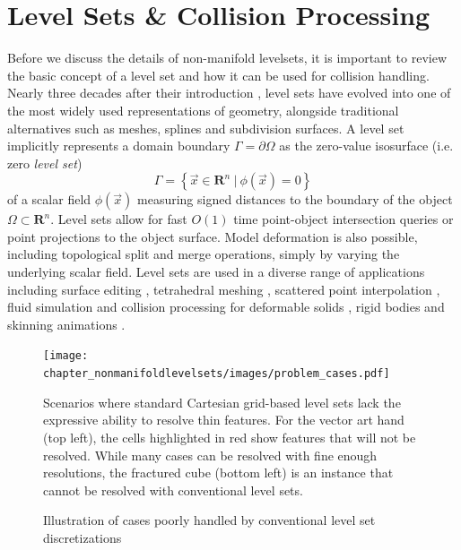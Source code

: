 \section{Level Sets \& Collision Processing}
Before we discuss the details of non-manifold levelsets, it is
important to review the basic concept of a level set and how it can be
used for collision handling. Nearly three decades after their
introduction \cite{OsherS:1988}, level sets have evolved into one of
the most widely used representations of geometry, alongside
traditional alternatives such as meshes, splines and subdivision
surfaces. A level set implicitly represents a domain boundary
$\Gamma=\partial\Omega$ as the zero-value isosurface (i.e. zero
\emph{level set})
\begin{equation}
\Gamma=\left\{\vec{x}\in\mathbf{R}^n\ |\ \phi(\vec{x})=0\right\}
\label{eqn:definition}
\end{equation}
of a scalar field $\phi(\vec{x})$ measuring signed distances to the
boundary of the object $\Omega\subset\mathbf{R}^n$. Level sets allow
for fast $O(1)$ time point-object intersection queries or point
projections to the object surface. Model deformation is also possible,
including topological split and merge operations, simply by varying
the underlying scalar field. Level sets are used in a diverse range of
applications including surface editing \cite{MusetBWB:2002},
tetrahedral meshing \cite{LabelS:2007}, scattered point interpolation
\cite{ZhaoOF:2001}, fluid simulation \cite{OsherF:2002} and collision
processing for deformable solids \cite{Gascu:1993}, rigid bodies
\cite{GuendBF:2003} and skinning animations \cite{VaillBGCRWGP:2013}.


\begin{figure}
  \centering
\texttt{[image: chapter\_nonmanifoldlevelsets/images/problem\_cases.pdf]}
\vspace*{-.15in}
\caption{Illustration of cases poorly handled by conventional level
  set discretizations} {Scenarios where standard Cartesian grid-based
  level sets lack the expressive ability to resolve thin features. For
  the vector art hand (top left), the cells highlighted in red show
  features that will not be resolved. While many cases can be resolved
  with fine enough resolutions, the fractured cube (bottom left) is an
  instance that cannot be resolved with conventional level sets.}
\label{fig:underresolved}
\vspace*{-.2in}
\end{figure}


